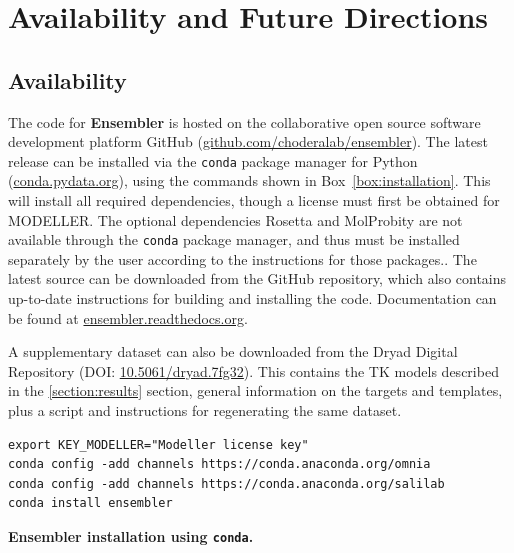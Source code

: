 \documentclass[aps,pre,twocolumn,nofootinbib,superscriptaddress,linenumbers]{revtex4-1}
\begin{document}
\section{Availability and Future Directions}
\label{section:availability}

\subsection*{Availability}

The code for {\bf Ensembler} is hosted on the collaborative open source software development platform GitHub (\href{http://github.com/choderalab/ensembler}{github.com/choderalab/ensembler}).
The latest release can be installed via the {\tt conda} package manager for Python (\href{http://conda.pydata.org}{conda.pydata.org}), using the commands shown in Box~\ref{box:installation}.
This will install all required dependencies, though a license must first be obtained for MODELLER.
The optional dependencies Rosetta and MolProbity are not available through the {\tt conda} package manager, and thus must be installed separately by the user according to the instructions for those packages..
The latest source can be downloaded from the GitHub repository, which also contains up-to-date instructions for building and installing the code.
Documentation can be found at \href{http://ensembler.readthedocs.org/en/latest/}{ensembler.readthedocs.org}.

A supplementary dataset can also be downloaded from the Dryad Digital Repository (DOI: \href{https://dx.doi.org/10.5061/dryad.7fg32}{10.5061/dryad.7fg32}).
This contains the TK models described in the \ref{section:results} section, general information on the targets and templates, plus a script and instructions for regenerating the same dataset.

\begin{codebox}[tbp]
\scriptsize
\begin{Verbatim}[frame=single]
export KEY_MODELLER="Modeller license key"
conda config -add channels https://conda.anaconda.org/omnia
conda config -add channels https://conda.anaconda.org/salilab
conda install ensembler
\end{Verbatim}
\caption{{\bf Ensembler installation using {\tt conda}.}
}
\label{box:installation}
\end{codebox}
\end{document}
